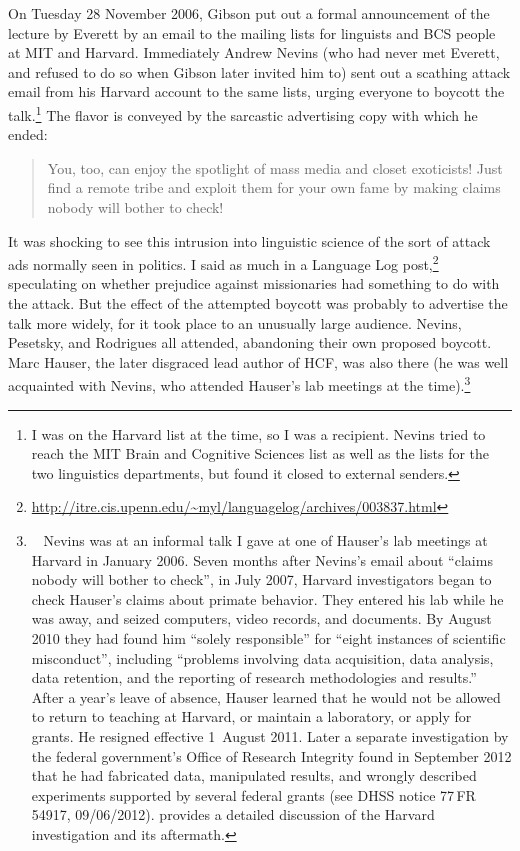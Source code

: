 \documentclass[output=paper,colorlinks,citecolor=brown
]{langscibook}
\begin{document}
On Tuesday 28 November 2006, Gibson put out a formal announcement of
the lecture by Everett by an email to the mailing lists for linguists
and BCS people at MIT and Harvard. Immediately Andrew Nevins (who had
never met Everett, and refused to do so when Gibson later invited him to)
sent out a scathing attack email from his Harvard account to the same
lists, urging everyone to boycott the talk.\footnote{%
   I was on the Harvard list at the time, so I was a recipient. Nevins
   tried to reach the MIT Brain and Cognitive Sciences list as well as
   the lists for the two linguistics departments, but found it closed to
   external senders.}
The flavor is conveyed by the sarcastic advertising copy with which
he ended:
\begin{quote}
\textsf{You, too, can enjoy the spotlight of mass media and closet
exoticists! Just find a remote tribe and exploit them for your
own fame by making claims nobody will bother to check!}
\end{quote}

It was shocking to see this intrusion into linguistic science of the
sort of attack ads normally seen in politics. I said as much in a
Language Log post,\footnote{%
   \url{http://itre.cis.upenn.edu/~myl/languagelog/archives/003837.html}}
speculating on whether prejudice against missionaries had something to
do with the attack. But the effect of the attempted boycott was probably
to advertise the talk more widely, for it took place to an unusually
large audience. Nevins, Pesetsky, and Rodrigues all attended, abandoning
their own proposed boycott.  Marc Hauser, the later disgraced lead author
of HCF, was also there (he was well acquainted with Nevins, who attended
Hauser's lab meetings at the time).\footnote{\label{misconduct}~
   Nevins was at an informal talk I gave at one of Hauser's lab meetings
   at Harvard in January 2006. Seven months after Nevins's email about
   ``claims nobody will bother to check'', in July 2007, Harvard
   investigators began to check Hauser's claims about primate behavior.
   They entered his lab while he was away, and seized computers, video
   records, and documents. By August 2010 they had found him ``solely
   responsible'' for ``eight instances of scientific misconduct'', including
   ``problems involving data acquisition, data analysis, data retention,
   and the reporting of research methodologies and results.'' After a year's
   leave of absence, Hauser learned that he would not be allowed to return
   to teaching at Harvard, or maintain a laboratory, or apply for grants.
   He resigned effective 1~August 2011. Later a separate investigation by
   the federal government's Office of Research Integrity found in September
   2012 that he had fabricated data, manipulated results, and wrongly
   described experiments supported by several federal grants (see DHSS
   notice 77\,FR\,54917, 09/06/2012). \citet{Gross11} provides a detailed
   discussion of the Harvard investigation and its aftermath.}
\end{document}
